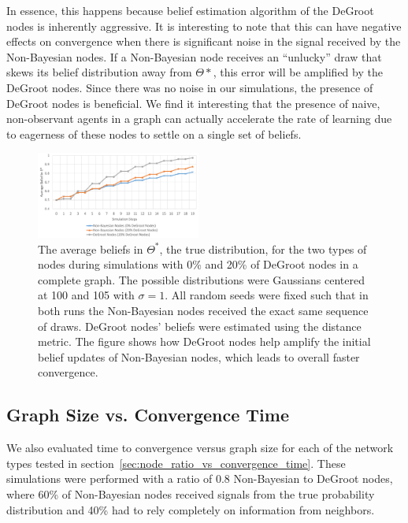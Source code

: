 \documentclass[letterpaper, 11pt, conference]{ieeeconf}
\begin{document}
In essence, this happens because belief estimation algorithm of the DeGroot nodes is inherently aggressive. It is interesting to note that this can have negative effects on convergence when there is significant noise in the signal received by the Non-Bayesian nodes. If a Non-Bayesian node receives an ``unlucky'' draw that skews its belief distribution away from $\Theta*$, this error will be amplified by the DeGroot nodes. Since there was no noise in our simulations, the presence of DeGroot nodes is beneficial. We find it interesting that the presence of naive, non-observant agents in a graph can actually accelerate the rate of learning due to eagerness of these nodes to settle on a single set of beliefs.

\begin{figure}[t]
\centering
\includegraphics[width=0.48\textwidth]{figures/dg_faster}
\caption{The average beliefs in $\Theta^*$, the true distribution, for the two types of nodes during simulations with 0\% and 20\% of DeGroot nodes in a complete graph. The possible distributions were Gaussians centered at 100 and 105 with $\sigma=1$. All random seeds were fixed such that in both runs the Non-Bayesian nodes received the exact same sequence of draws. DeGroot nodes' beliefs were estimated using the distance metric. The figure shows how DeGroot nodes help amplify the initial belief updates of Non-Bayesian nodes, which leads to overall faster convergence.}
\label{fig:dg_faster}
\end{figure}


\subsection{Graph Size vs. Convergence Time}

We also evaluated time to convergence versus graph size for each of the network types tested in section~\ref{sec:node_ratio_vs_convergence_time}.  These simulations were performed with a ratio of 0.8 Non-Bayesian to DeGroot nodes, where 60\% of Non-Bayesian nodes received signals from the true probability distribution and 40\% had to rely completely on information from neighbors.
\end{document}
